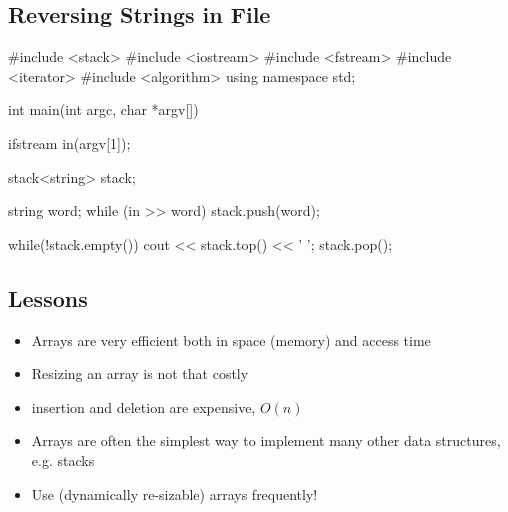 
\begin{slide}
\section[-1]{Reversing Strings in File}

\begin{cpp}
#include <stack>
#include <iostream>
#include <fstream>
#include <iterator>
#include <algorithm>
using namespace std;

int main(int argc, char *argv[]) {
  ifstream in(argv[1]);

  stack<string> stack;

  string word;
  while (in >> word)
    stack.push(word);

  while(!stack.empty()) {
      cout << stack.top() << ' ';
      stack.pop();
  }
}
\end{cpp}
\end{slide}


\begin{slide}
\section{Lessons}

\begin{PauseHighLight}
  \begin{itemize}
  \item Arrays are very efficient both in space (memory) and access
    time\pause
  \item Resizing an array is not that costly\pause
  \item insertion and deletion are expensive, $O(n)$\pause
  \item Arrays are often the simplest way to implement many other
    data structures, e.g. stacks\pause
  \item Use (dynamically re-sizable) arrays frequently!\pause
  \end{itemize}
\end{PauseHighLight}

\end{slide}
